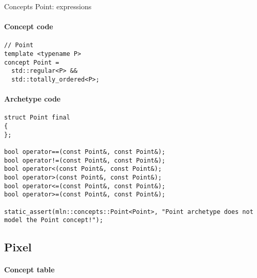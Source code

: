 \begin{table}[H]
\begin{scriptsize}
    \caption{Concepts Point: expressions}
  \end{scriptsize}
  \label{table:concept.point.expressions}
\end{table}

\paragraph{Concept code}

\begin{verbatim}
// Point
template <typename P>
concept Point =
  std::regular<P> &&
  std::totally_ordered<P>;
\end{verbatim}

\paragraph{Archetype code}

\begin{verbatim}
struct Point final
{
};

bool operator==(const Point&, const Point&);
bool operator!=(const Point&, const Point&);
bool operator<(const Point&, const Point&);
bool operator>(const Point&, const Point&);
bool operator<=(const Point&, const Point&);
bool operator>=(const Point&, const Point&);

static_assert(mln::concepts::Point<Point>, "Point archetype does not model the Point concept!");
\end{verbatim}


\clearpage

\subsection{Pixel}

\paragraph{Concept table}

